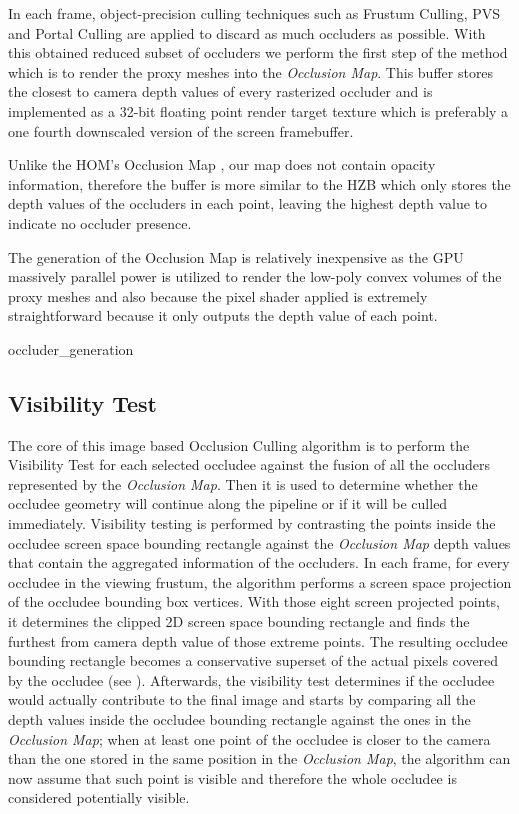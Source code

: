 \documentclass[10pt, conference]{IEEEtran}
\begin{document}
In each frame, object-precision culling techniques such as Frustum Culling, PVS and Portal Culling \cite{survey_visibility} are applied 
to discard as much occluders as possible. 
With this obtained reduced subset of occluders we perform the first step of the method which is to render the proxy meshes into the \emph{Occlusion Map}. 
This buffer stores the closest to camera depth values of every rasterized occluder and is implemented as a 32-bit floating point render target texture 
which is preferably a one fourth downscaled version of the screen framebuffer. \

Unlike the HOM's Occlusion Map \cite{hom}, our map does not contain opacity information, therefore the buffer is more similar 
to the HZB \cite{Hierarchical_zbuffer} which only stores the depth values of the occluders in 
each point, leaving the highest depth value to indicate no occluder presence.\

The generation of the Occlusion Map is relatively inexpensive as the GPU massively parallel power is utilized to render the low-poly convex volumes of 
the proxy meshes and also because the pixel shader applied is extremely straightforward because it only outputs the depth value of each point.

{occluder_generation}{
%
}


\subsection{Visibility Test}
%
The core of this image based Occlusion Culling algorithm is to perform the Visibility Test for each selected occludee against the fusion of all the occluders represented by the \emph{Occlusion Map}. 
Then it is used to determine whether the occludee geometry will continue along the pipeline or if it will be culled immediately.
Visibility testing is performed by contrasting the points inside the occludee screen space bounding rectangle against the \emph{Occlusion Map} depth values that contain the aggregated information of the occluders.  
In each frame, for every occludee in the viewing frustum, the algorithm performs a screen space projection of the occludee bounding box vertices. 
With those eight screen projected points, it determines the clipped 2D screen space bounding rectangle and finds the furthest from camera depth value of those extreme points. 
The resulting occludee bounding rectangle becomes a conservative superset of the actual pixels covered by the occludee  (see ). 
Afterwards, the visibility test determines if the occludee would actually contribute to the final image and starts by comparing all 
the depth values inside the occludee bounding rectangle against the ones in the \emph{Occlusion Map}; when at least one point of the occludee is closer to the camera than the one stored in the same position in the \emph{Occlusion Map}, the algorithm can now assume that such point is visible and therefore the whole occludee is considered potentially visible.
\end{document}
